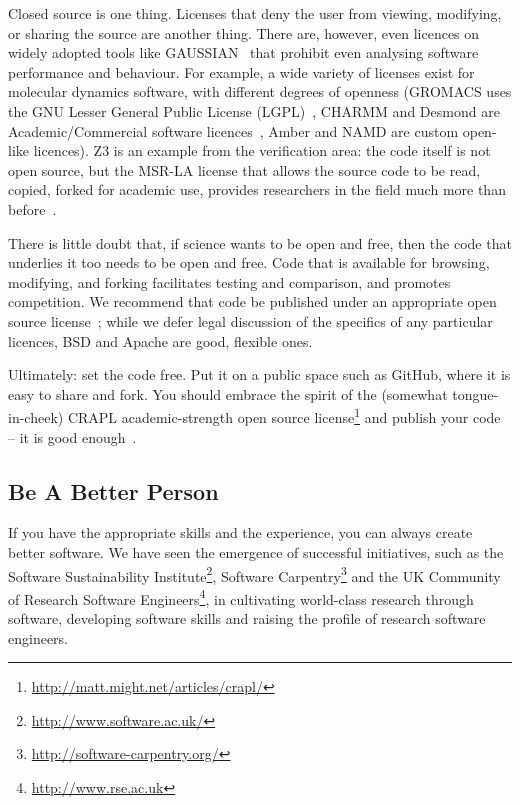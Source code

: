 \documentclass[a4paper,11pt]{article}
\begin{document}
Closed source is one thing. Licenses that deny the user from viewing,
modifying, or sharing the source are another thing. There are,
however, even licences on widely adopted tools like
GAUSSIAN~\cite{Giles2004} that prohibit even analysing software
performance and behaviour. For example, a wide variety of licenses
exist for molecular dynamics software, with different degrees of
openness (GROMACS uses the GNU Lesser General Public License
(LGPL)~\cite{Hess2008}, CHARMM and Desmond are Academic/Commercial
software licences~\cite{Brooks2009,Bowers2006}, Amber and NAMD are
custom open-like licences). Z3 is an example from the verification
area: the code itself is not open source, but the MSR-LA license that allows
the source code to be read, copied, forked for academic use, provides
researchers in the field much more than
before~\cite{deMoura2012Z3open}.
 

 There is little
doubt that, if science wants to be open and free, then the code that
underlies it too needs to be open and free. Code that is available for
browsing, modifying, and forking facilitates testing and comparison,
and promotes competition. We recommend that code be published under an
appropriate open source license~\cite{osl}; while we defer legal
discussion of the specifics of any particular licences, BSD and Apache are good,
flexible ones.

Ultimately: set the code free. Put it on a public space such as
GitHub, where it is easy to share and fork. You should embrace the
spirit of the (somewhat tongue-in-cheek) CRAPL academic-strength open
source license\footnote{\url{http://matt.might.net/articles/crapl/}}
and publish your code -- it is good enough~\cite{barnes:2010}.

\subsection{Be A Better Person}

If you have the appropriate skills and the experience, you can always
create better software. We have seen the emergence of successful
initiatives, such as the Software Sustainability
Institute\footnote{\url{http://www.software.ac.uk/}}, Software
Carpentry\footnote{\url{http://software-carpentry.org/}} and the UK
Community of Research Software
Engineers\footnote{\url{http://www.rse.ac.uk}}, in cultivating
world-class research through software, developing software skills and
raising the profile of research software engineers.
\end{document}
